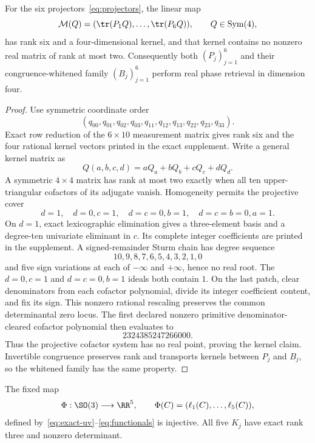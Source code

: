 \begin{theorem}
\label{thm:kernel-certificate}
For the six projectors~\eqref{eq:projectors}, the linear map
\[
 \mathcal M(Q)=(\tr(P_1Q),\ldots,\tr(P_6Q)),
 \qquad Q\in\operatorname{Sym}(4),
\]
has rank six and a four-dimensional kernel, and that kernel contains no
nonzero real matrix of rank at most two.  Consequently both
$(P_j)_{j=1}^6$ and their congruence-whitened family
$(B_j)_{j=1}^6$ perform real phase retrieval in dimension four.
\end{theorem}

\begin{proof}
Use symmetric coordinate order
\[
(q_{00},q_{01},q_{02},q_{03},q_{11},q_{12},q_{13},q_{22},q_{23},q_{33}).
\]
Exact row reduction of the $6\times10$ measurement matrix gives rank six and
the four rational kernel vectors printed in the exact supplement.  Write a
general kernel matrix as
\[
 Q(a,b,c,d)=aQ_a+bQ_b+cQ_c+dQ_d.
\]
A symmetric $4\times4$ matrix has rank at most two exactly when all ten
upper-triangular cofactors of its adjugate vanish.  Homogeneity permits the
projective cover
\[
d=1,\quad d=0,c=1,\quad d=c=0,b=1,\quad d=c=b=0,a=1.
\]
On $d=1$, exact lexicographic elimination gives a three-element basis and a
degree-ten univariate eliminant in $c$.  Its complete integer coefficients
are printed in the supplement.  A signed-remainder Sturm chain has degree
sequence
\[
10,9,8,7,6,5,4,3,2,1,0
\]
and five sign variations at each of $-\infty$ and $+\infty$, hence no real
root.  The $d=0,c=1$ and $d=c=0,b=1$ ideals both contain $1$.  On the last
patch, clear denominators from each cofactor polynomial, divide its integer
coefficient content, and fix its sign.  This nonzero rational rescaling
preserves the common determinantal zero locus.  The first declared nonzero
primitive denominator-cleared cofactor polynomial then evaluates to
\[
2324385247266000.
\]
Thus the projective cofactor system has no real point, proving the kernel
claim.  Invertible congruence preserves rank and transports kernels between
$P_j$ and $B_j$, so the whitened family has the same property.
\end{proof}

\begin{theorem}\label{thm:fixed-five}
The fixed map
\begin{equation}\label{eq:fixed-map}
 \Phi:\SO(3)\longrightarrow\RR^5,\qquad
 \Phi(C)=(\ell_1(C),\ldots,\ell_5(C)),
\end{equation}
defined by~\eqref{eq:exact-uv}--\eqref{eq:functionals} is injective.
All five $K_j$ have exact rank three and nonzero determinant.
\end{theorem}

